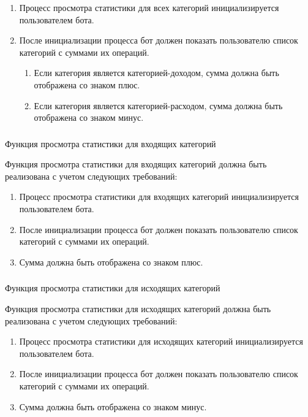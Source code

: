 \begin{enumerate}
	\item Процесс просмотра статистики для всех категорий инициализируется пользователем бота.
	\item После инициализации процесса бот должен показать пользователю список категорий с суммами их операций.
	\begin{enumerate}
		\item Если категория является категорией-доходом, сумма должна быть отображена со знаком плюс.
		\item Если категория является категорией-расходом, сумма должна быть отображена со знаком минус.
	\end{enumerate}
\end{enumerate}

\subsubsection{} Функция просмотра статистики для входящих категорий
\label{sec:domain:specification:showincomestats}

Функция просмотра статистики для входящих категорий должна быть реализована с учетом следующих требований:

\begin{enumerate}
	\item Процесс просмотра статистики для входящих категорий инициализируется пользователем бота.
	\item После инициализации процесса бот должен показать пользователю список категорий с суммами их операций.
	\item Сумма должна быть отображена со знаком плюс.
\end{enumerate}

\subsubsection{} Функция просмотра статистики для исходящих категорий
\label{sec:domain:specification:showexpensestats}

Функция просмотра статистики для исходящих категорий должна быть реализована с учетом следующих требований:

\begin{enumerate}
	\item Процесс просмотра статистики для исходящих категорий инициализируется пользователем бота.
	\item После инициализации процесса бот должен показать пользователю список категорий с суммами их операций.
	\item Сумма должна быть отображена со знаком минус.
\end{enumerate}

